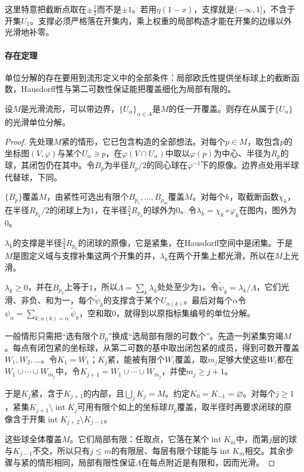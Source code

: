 这里特意把截断点取在$\pm\tfrac12$而不是$\pm1$。若用$\eta(1-x)$，支撑就是$(-\infty,1]$，不含于开集$U_1$。支撑必须严格落在开集内，乘上权重的局部构造才能在开集的边缘以外光滑地补零。

\paragraph{存在定理}
单位分解的存在要用到流形定义中的全部条件：局部欧氏性提供坐标球上的截断函数，Hausdorff性与第二可数性保证能把覆盖细化为局部有限的。

\begin{theorem}[光滑单位分解的存在]
\label{thm:mfd-partition-unity-existence}
设$M$是光滑流形，可以带边界，$\{U_\alpha\}_{\alpha\in A}$是$M$的任一开覆盖。则存在从属于$\{U_\alpha\}$的光滑单位分解。
\end{theorem}

\begin{proof}
先处理$M$紧的情形，它已包含构造的全部想法。对每个$p\in M$，取包含$p$的坐标图$(V,\varphi)$与某个$U_\alpha\ni p$，在$\varphi(V\cap U_\alpha)$中取以$\varphi(p)$为中心、半径为$R_p$的球，其闭包仍在其中。令$B_p$为半径$R_p/2$的同心球在$\varphi^{-1}$下的原像。边界点处用半球代替球，下同。

$\{B_p\}$覆盖$M$，由紧性可选出有限个$B_{p_1},\ldots,B_{p_m}$覆盖$M$。对每个$k$，取截断函数$\chi_k$，在半径$R_{p_k}/2$的闭球上为$1$，在半径$\tfrac34R_{p_k}$的球外为$0$。令$\lambda_k=\chi_k\circ\varphi_k$在图内，图外为$0$。

$\lambda_k$的支撑是半径$\tfrac34R_{p_k}$的闭球的原像，它是紧集，在Hausdorff空间中是闭集。于是$M$是图定义域与支撑补集这两个开集的并，$\lambda_k$在两个开集上都光滑，所以在$M$上光滑。

$\lambda_k\geq0$，并在$B_{p_k}$上等于$1$，所以$\Lambda=\sum_k\lambda_k$处处至少为$1$。令$\tilde\psi_k=\lambda_k/\Lambda$，它们光滑、非负、和为一，每个$\tilde\psi_k$的支撑含于某个$U_{\alpha(k)}$。最后对每个$\alpha$令$\psi_\alpha=\sum_{k:\alpha(k)=\alpha}\tilde\psi_k$，空和取$0$，就得到以原指标集编号的单位分解。

一般情形只需把“选有限个$B_p$”换成“选局部有限的可数个”。先造一列紧集穷竭$M$。每点有闭包紧的坐标球，从第二可数的基中取出闭包紧的成员，得到可数开覆盖$W_1,W_2,\ldots$。令$K_1=\overline{W_1}$；$K_j$紧，能被有限个$W_i$覆盖，取$m_j$足够大使这些$W_i$都在$W_1\cup\cdots\cup W_{m_j}$中，令$K_{j+1}=\overline{W_1\cup\cdots\cup W_{m_j}}$，并使$m_j\geq j+1$。

于是$K_j$紧，含于$K_{j+1}$的内部，且$\bigcup_jK_j=M$。约定$K_0=K_{-1}=\varnothing$。对每个$j\geq1$，紧集$K_{j+1}\setminus\operatorname{int}K_j$可用有限个如上的坐标球$B_p$覆盖，取半径时再要求闭球的原像含于开集$\operatorname{int}K_{j+2}\setminus K_{j-1}$。

这些球全体覆盖$M$。它们局部有限：任取点，它落在某个$\operatorname{int}K_m$中，而第$j$层的球与$K_{j-1}$不交，所以只有$j\leq m$的有限层、每层有限个球能与$\operatorname{int}K_m$相交。其余步骤与紧的情形相同，局部有限性保证$\Lambda$在每点附近是有限和，因而光滑。
\end{proof}

